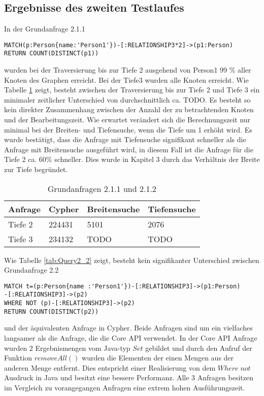 \subsection{Ergebnisse des zweiten Testlaufes}
In der Grundanfrage 2.1.1
\begin{Verbatim}[frame=single]
MATCH(p:Person{name:'Person1'})-[:RELATIONSHIP3*2]->(p1:Person) 
RETURN COUNT(DISTINCT(p1))
\end{Verbatim}
 wurden bei der Traversierung bis zur Tiefe 2 ausgehend von Person1 99 \% aller Knoten des Graphen erreicht. Bei der Tiefe3 wurden alle Knoten erreicht. Wie Tabelle \ref{tab:Query2_1} zeigt, besteht zwischen der Traversierung bis zur Tiefe 2 und Tiefe 3  ein minimaler zeitlicher Unterschied von durchschnittlich ca.  {\color{red}  TODO}. Es besteht so kein direkter Zusammenhang zwischen der Anzahl der zu betrachtenden Knoten und der Bearbeitungszeit. Wie erwartet verändert sich die Berechnungszeit nur minimal bei der Breiten- und Tiefensuche, wenn die Tiefe um 1 erhöht wird.  \newline 
Es wurde bestätigt, dass die Anfrage mit Tiefensuche signifikant schneller als die Anfrage mit Breitensuche ausgeführt wird, in diesem Fall ist die Anfrage für die Tiefe 2 ca. 60\% schneller. Dies wurde in Kapitel 3 durch das Verhältnis der Breite zur Tiefe begründet. 
\FloatBarrier
\begin{table}[h]
\centering
		\begin{tabular}{ |p{3cm}||p{3cm}|p{3cm}|p{3cm}|  }
			\hline
			Anfrage& Cypher & Breitensuche&Tiefensuche\\
			\hline
			Tiefe 2   & 224431    & 5101&  2076\\
			Tiefe 3&    234132  & TODO   & TODO\\
			\hline
		\end{tabular}
		\caption{Grundanfragen 2.1.1 und 2.1.2}
		\label{tab:Query2_1}
\end{table}
\FloatBarrier
\noindent Wie Tabelle \ref{tab:Query2_2} zeigt, besteht kein  signifikanter Unterschied zwischen Grundanfrage 2.2
\begin{Verbatim}[frame=single]
MATCH t=(p:Person{name :'Person1'})-[:RELATIONSHIP3]->(p1:Person)
-[:RELATIONSHIP3]->(p2)
WHERE NOT (p)-[:RELATIONSHIP3]->(p2) 
RETURN COUNT(DISTINCT(p2))
\end{Verbatim} 
 und der äquivalenten Anfrage in Cypher. Beide Anfragen sind um ein vielfaches langsamer als die Anfrage, die die Core API verwendet. In der Core API Anfrage wurden 2 Ergebnismengen vom Java-typ $Set$ gebildet und durch den Aufruf der Funktion $removeAll()$  wurden die Elementen der einen Mengen aus der anderen Menge entfernt. Dies entspricht einer Realisierung von dem $Where\;not$ Ausdruck  in Java und besitzt eine bessere Performanz. Alle 3 Anfragen besitzen im Vergleich zu vorangegangen Anfragen eine extrem hohen Ausführungszeit.
